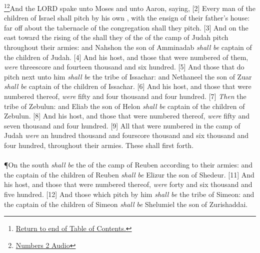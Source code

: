 \footnote{\textcolor[cmyk]{0.99998,1,0,0}{\hyperlink{TOC}{Return to end of Table of Contents.}}}\footnote{\href{https://audiobible.com/bible/numbers_2.html}{\textcolor[cmyk]{0.99998,1,0,0}{Numbers 2 Audio}}}\textcolor[cmyk]{0.99998,1,0,0}{And the LORD spake unto Moses and unto Aaron, saying,}
[2] \textcolor[cmyk]{0.99998,1,0,0}{Every man of the children of Israel shall pitch by his own , with the ensign of their father's house: far off about the tabernacle of the congregation shall they pitch.}
[3] \textcolor[cmyk]{0.99998,1,0,0}{And on the east  toward the rising of the  shall they of the  of the camp of Judah pitch throughout their armies: and Nahshon the son of Amminadab \emph{shall} \emph{be} captain of the children of Judah.}
[4] \textcolor[cmyk]{0.99998,1,0,0}{And his host, and those that were numbered of them, \emph{were} threescore and fourteen thousand and six hundred.}
[5] \textcolor[cmyk]{0.99998,1,0,0}{And those that do pitch next unto him \emph{shall} \emph{be} the tribe of Issachar: and Nethaneel the son of Zuar \emph{shall} \emph{be} captain of the children of Issachar.}
[6] \textcolor[cmyk]{0.99998,1,0,0}{And his host, and those that were numbered thereof, \emph{were} fifty and four thousand and four hundred.}
[7] \textcolor[cmyk]{0.99998,1,0,0}{\emph{Then} the tribe of Zebulun: and Eliab the son of Helon \emph{shall} \emph{be} captain of the children of Zebulun.}
[8] \textcolor[cmyk]{0.99998,1,0,0}{And his host, and those that were numbered thereof, \emph{were} fifty and seven thousand and four hundred.}
[9] \textcolor[cmyk]{0.99998,1,0,0}{All that were numbered in the camp of Judah \emph{were} an hundred thousand and fourscore thousand and six thousand and four hundred, throughout their armies. These shall first  forth.}\\
\\
\P \textcolor[cmyk]{0.99998,1,0,0}{On the south  \emph{shall} \emph{be} the  of the camp of Reuben according to their armies: and the captain of the children of Reuben \emph{shall} \emph{be} Elizur the son of Shedeur.}
[11] \textcolor[cmyk]{0.99998,1,0,0}{And his host, and those that were numbered thereof, \emph{were} forty and six thousand and five hundred.}
[12] \textcolor[cmyk]{0.99998,1,0,0}{And those which pitch by him \emph{shall} \emph{be} the tribe of Simeon: and the captain of the children of Simeon \emph{shall} \emph{be} Shelumiel the son of Zurishaddai.}
